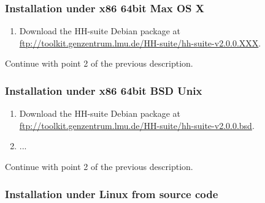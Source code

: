 \documentclass[11pt,a4paper]{article}
\begin{document}
\subsubsection*{Installation under x86 64bit Max OS X}

\begin{enumerate}
\item Download the HH-suite Debian package at \url{ftp://toolkit.genzentrum.lmu.de/HH-suite/hh-suite-v2.0.0.XXX}.
\end{enumerate}

Continue with point 2 of the previous description.

\subsubsection*{Installation under x86 64bit BSD Unix}

\begin{enumerate}
\item Download the HH-suite Debian package at \url{ftp://toolkit.genzentrum.lmu.de/HH-suite/hh-suite-v2.0.0.bsd}.
\item ...\\
\end{enumerate}
Continue with point 2 of the previous description.


\subsubsection*{Installation under Linux from source code} 
\end{document}

